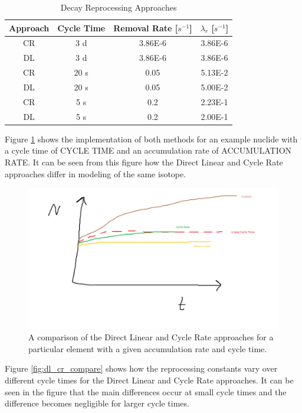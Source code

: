 \begin{table}[H]
\renewcommand{\arraystretch}{1.25}
\caption{Decay Reprocessing Approaches}
\label{tab:repr_decay_view}
\begin{center}
\begin{tabular}{ | c | c | c | c | }
 \hline
 Approach & Cycle Time & Removal Rate [$s^{-1}$] & $\lambda_{r}$ [$s^{-1}$]\\
 \hline
 \hline
 CR & 3 d & 3.86E-6 & 3.86E-6\\
 DL & 3 d & 3.86E-6 & 3.86E-6\\
 CR & 20 s & 0.05 & 5.13E-2\\
 DL & 20 s & 0.05 & 5.00E-2\\
 CR & 5 s & 0.2 & 2.23E-1\\
 DL & 5 s & 0.2 & 2.00E-1\\
 \hline
\end{tabular}
\end{center}
\end{table}

Figure \ref{fig:dl_cr_compare_linear} shows the implementation of both methods for an example nuclide with a cycle time of CYCLE TIME and an accumulation rate of ACCUMULATION RATE. It can be seen from this figure how the Direct Linear and Cycle Rate approaches differ in modeling of the same isotope.

\begin{figure}[H]
  \centering
  \includegraphics[scale=0.25]{images/direct_linear_compare.png}
  \caption{A comparison of the Direct Linear and Cycle Rate approaches for a particular element with a given accumulation rate and cycle time.}
   \label{fig:dl_cr_compare_linear}
\end{figure}


Figure \ref{fig:dl_cr_compare} shows how the reprocessing constants vary over different cycle times for the Direct Linear and Cycle Rate approaches. It can be seen in the figure that the main differences occur at small cycle times and the difference becomes negligible for larger cycle times.

